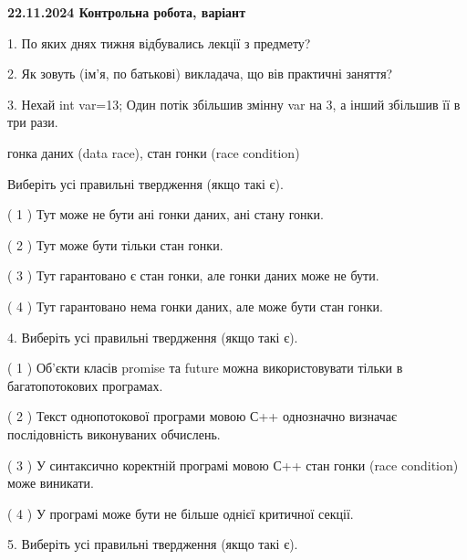 \documentclass[12pt, ukrainian]{article}
\begin{document}
\vspace{4mm}
\newpage
\begin {large}

\textbf{22.11.2024 Контрольна робота, варіант  }\par


{
1. По яких днях тижня відбувались лекції з предмету?



\vspace{5mm}
2. Як зовуть (ім'я, по батькові) викладача, що вів практичні заняття?



\vspace{5mm}
3. Нехай int var=13; Один потік збільшив змінну var на 3, а інший збільшив її в три рази.

гонка даних (data race), стан гонки (race condition)

Виберіть усі правильні твердження (якщо такі є).\par
\vspace{2mm}
( 1 ) Тут може не бути ані гонки даних, ані стану гонки.%

( 2 ) Тут може бути тільки стан гонки.%

( 3 ) Тут гарантовано є стан гонки, але гонки даних може не бути.%

( 4 ) Тут гарантовано нема гонки даних, але може бути стан гонки.%


\vspace{5mm}
4. Виберіть усі правильні твердження (якщо такі є).\par
\vspace{2mm}

( 1 ) Об’єкти класів promise та future можна використовувати тільки в багатопотокових програмах.%

( 2 ) Текст однопотокової програми мовою С++ однозначно визначає послідовність виконуваних обчислень.%

( 3 ) У синтаксично коректній програмі мовою С++ стан гонки (race condition) може виникати.%

( 4 ) У програмі може бути не більше однієї критичної секції.%


\vspace{5mm}
5. Виберіть усі правильні твердження (якщо такі є).\par
\vspace{2mm}

}
\end{large}
\end{document}
